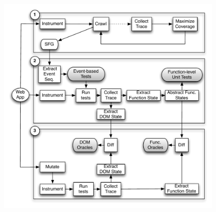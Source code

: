 \begin{figure}[!t]
  \centering
  \includegraphics[width=1\hsize]{fig/approach-view-revised}
  \vspace{-0.1in} 
  \label{Fig:approach-view}
\end{figure}

